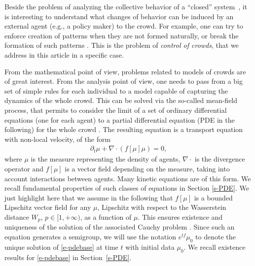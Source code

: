 \documentclass{article}
\theoremstyle{definition}\newtheorem{remark}{Remark}
\newcommand{\Pq}[1]{\left[ #1 \right] }
\newcommand{\bqn}{\begin{eqnarray}}
\newcommand{\eqnl}[1]{\label{#1}\end{eqnarray}}
\renewcommand{\r}[1]{\eqref{#1}}
\begin{document}
Beside the problem of analyzing the collective behavior of a ``closed'' system~\cite{CFP11}, it is interesting to understand what changes of behavior can be induced by an external agent (e.g., a policy maker) to the crowd. For example, one can try to enforce creation of patterns when they are not formed naturally, or break the formation of such patterns \cite{CS-control,CS-control-1,FPR-14,controlKCS, HPS15}. This is the problem of {\em control of crowds}, that we address in this article in a specific case.

From the mathematical point of view, problems related to models of crowds are of great interest. From the analysis point of view, one needs to pass from a big set of simple rules for each individual to a model capable of capturing the dynamics of the whole crowd. This can be solved via the so-called mean-field process, that permits to consider the limit of a set of ordinary differential equations (one for each agent) to a partial differential equation (PDE in the following) for the whole crowd
\cite{controlKCS}.
The resulting equation is a transport equation with non-local velocity, of the form
\bqn
\partial_t \mu + \nabla\cdot (f\Pq{\mu}\mu)=0,
\eqnl{e-pdebase}
where $\mu$ is the measure representing the density of agents, $\nabla\cdot$ is the divergence operator and $f[\mu]$ is a vector field depending on the measure, taking into account interactions between agents. Many kinetic equations are of this form.
We recall fundamental properties of such classes of equations in Section \ref{s-PDE}. We just highlight here that we assume in the following that $f[\mu]$ is a bounded Lipschitz vector field for any $\mu$, Lipschitz with respect to the Wasserstein distance $W_p$,  $p\in[1,+\infty)$,  as a function of $\mu$. This ensures existence and uniqueness of the solution of the associated Cauchy problem \cite{ambrosio-gangbo,pedestrian}. Since such an equation generates a semigroup, we will use the notation $e^{t f}\mu_0$ to denote the unique solution of \r{e-pdebase} at time $t$ with initial data $\mu_0$. We recall existence results for \r{e-pdebase} in Section~\ref{s-PDE}.
\end{document}
